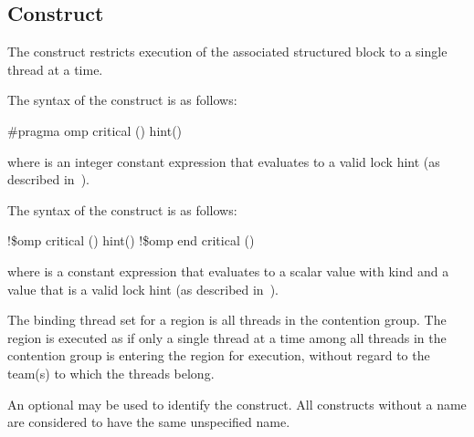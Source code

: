 \subsection{ Construct}
\label{subsec:critical Construct}
\summary
The  construct restricts execution of the associated structured block to a 
single thread at a time.

\syntax
\begin{ccppspecific}
The syntax of the  construct is as follows:

\begin{boxedcode}
\#pragma omp critical \plc{[}() \plc{[}hint()\plc{] ] new-line}
\end{boxedcode}

where  is an integer constant expression that
evaluates to a valid lock hint (as described 
in~).
\end{ccppspecific}

\begin{fortranspecific}
The syntax of the  construct is as follows:

\begin{boxedcode}
!\$omp critical \plc{[}() \plc{[}hint()\plc{] ]}
!\$omp end critical \plc{[}()\plc{]}  
\end{boxedcode}

where  is a constant expression that evaluates to
a scalar value with kind  and  a value
that is a valid lock hint (as described 
in~).
\end{fortranspecific}

\binding
The binding thread set for a  region is all threads in the contention group. 
The region is executed as if only a single thread at a time among all threads in the 
contention group is entering the region for execution, without regard to the team(s) to which the threads belong. 

\descr
An optional  may be used to identify the  construct. All  
constructs without a name are considered to have the same unspecified name. 

